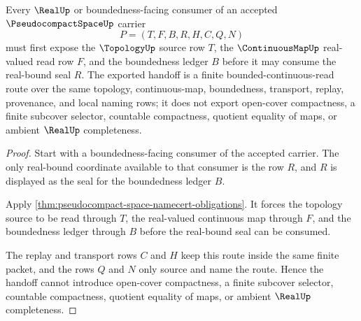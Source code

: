 \begin{theorem}
\label{thm:pseudocompact-space-bounded-continuous-handoff}
Every $\RealUp$ or boundedness-facing consumer of an accepted $\PseudocompactSpaceUp$ carrier
$$
P=(T,F,B,R,H,C,Q,N)
$$
must first expose the $\TopologyUp$ source row $T$, the $\ContinuousMapUp$ real-valued read row $F$, and the boundedness ledger $B$ before it may consume the real-bound seal $R$. The exported handoff is a finite bounded-continuous-read route over the same topology, continuous-map, boundedness, transport, replay, provenance, and local naming rows; it does not export open-cover compactness, a finite subcover selector, countable compactness, quotient equality of maps, or ambient $\RealUp$ completeness.
\end{theorem}
\begin{proof}
Start with a boundedness-facing consumer of the accepted carrier. The only real-bound coordinate available to that consumer is the row $R$, and $R$ is displayed as the seal for the boundedness ledger $B$.

Apply \autoref{thm:pseudocompact-space-namecert-obligations}. It forces the topology source to be read through $T$, the real-valued continuous map through $F$, and the boundedness ledger through $B$ before the real-bound seal can be consumed.

The replay and transport rows $C$ and $H$ keep this route inside the same finite packet, and the rows $Q$ and $N$ only source and name the route. Hence the handoff cannot introduce open-cover compactness, a finite subcover selector, countable compactness, quotient equality of maps, or ambient $\RealUp$ completeness.
\end{proof}


\begin{closurestatus}{\PseudocompactSpaceUp}
  \theoryclosure{\seedClosure}
  \formalstatus{\unformalizedV}
\end{closurestatus}
